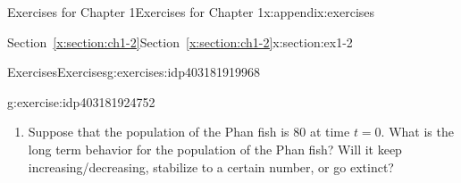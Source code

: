 \documentclass[oneside,10pt,]{book}
\newcommand{\xreffont}{\relax}
\numberwithin{equation}{section}
\numberwithin{equation}{section}
\begin{document}
\begin{appendixptx}{Exercises for Chapter 1}{}{Exercises for Chapter 1}{}{}{x:appendix:exercises}
\begin{sectionptx}{Section~{\xreffont\ref*{x:section:ch1-2}}}{}{Section~{\xreffont\ref*{x:section:ch1-2}}}{}{}{x:section:ex1-2}
\begin{exercises-subsection-numberless}{Exercises}{}{Exercises}{}{}{g:exercises:idp403181919968}
\begin{divisionexercise}{3}{}{}{g:exercise:idp403181924752}
\begin{image}{0}{1}{0}
\end{image}%
%
\begin{enumerate}[label=(\alph*)]
\item{}Suppose that the population of the Phan fish is \(80\) at time \(t=0\). What is the long term behavior for the population of the Phan fish? Will it keep increasing\slash{}decreasing, stabilize to a certain number, or go extinct?%
\end{enumerate}
\end{divisionexercise}%
\end{exercises-subsection-numberless}
\end{sectionptx}
\end{appendixptx}
%
%
\typeout{************************************************}
\typeout{************************************************}
%
\end{document}
